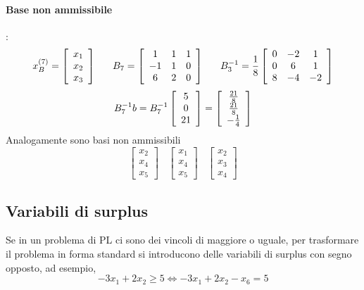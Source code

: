 \documentclass[12pt,a4paper]{article}
\begin{document}
\paragraph{Base non ammissibile}:
$$x_B^{(7)} = \left[\begin{array}{c}x_1\\x_2\\x_3\end{array}\right] \ \ \ \ \ B_7=\left[\begin{array}{ccc}1&1&1\\-1&1&0\\6&2&0\end{array}\right] \ \ \ \ \ B_3^{-1}={1\over8}\left[\begin{array}{ccc}0&-2&1\\0&6&1\\8&-4&-2\end{array}\right]$$
$$B_7^{-1}b=B_7^{-1}\left[\begin{array}{c}5\\0\\21\end{array}\right] = \left[\begin{array}{c}{21\over8}\\{21\over8}\\-{1\over4}\end{array}\right]$$
Analogamente sono basi non ammissibili 
$$\left[\begin{array}{c}x_2\\x_4\\x_5\end{array}\right] \ \ \ \ \left[\begin{array}{c}x_1\\x_4\\x_5\end{array}\right] \ \ \ \ \left[\begin{array}{c}x_2\\x_3\\x_4\end{array}\right]$$

\subsection{Variabili di surplus}
Se in un problema di PL ci sono dei vincoli di maggiore o uguale, per trasformare il problema in forma standard si introducono delle variabili di surplus con segno opposto, ad esempio, $$-3x_1+2x_2 \geq 5 \Longleftrightarrow -3x_1+2x_2 - x_6 = 5$$
\end{document}
